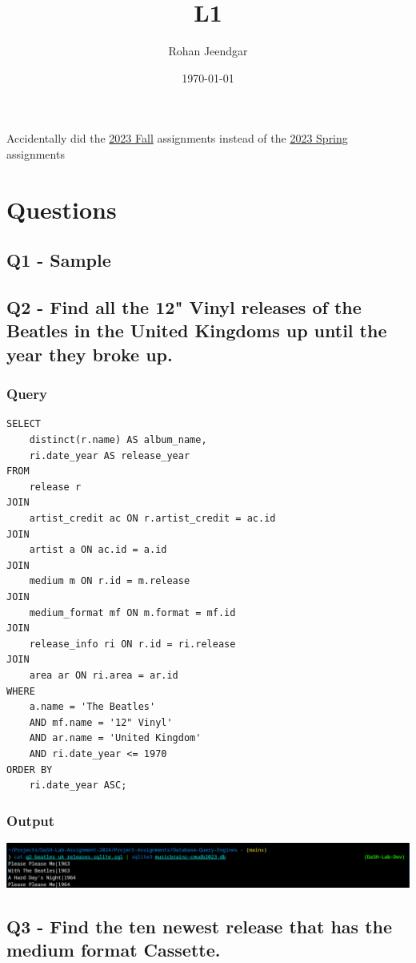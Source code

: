 \documentclass[11pt]{article}
\author{Rohan Jeendgar}
\date{\today}
\title{L1}
\begin{document}
\maketitle
\tableofcontents

Accidentally did the \href{https://15445.courses.cs.cmu.edu/fall2023/homework1/}{2023 Fall} assignments instead of the \href{https://15445.courses.cs.cmu.edu/spring2023/homework1/}{2023 Spring} assignments
\section{Questions}
\label{sec:org77b212d}
\subsection{Q1 - Sample}
\label{sec:org28f8250}
\subsection{Q2 - Find all the 12" Vinyl releases of the Beatles in the United Kingdoms up until the year they broke up.}
\label{sec:orgc064968}
\subsubsection{Query}
\label{sec:org17f4b11}
\begin{verbatim}
SELECT
    distinct(r.name) AS album_name,
    ri.date_year AS release_year
FROM
    release r
JOIN
    artist_credit ac ON r.artist_credit = ac.id
JOIN
    artist a ON ac.id = a.id
JOIN
    medium m ON r.id = m.release
JOIN
    medium_format mf ON m.format = mf.id
JOIN
    release_info ri ON r.id = ri.release
JOIN
    area ar ON ri.area = ar.id
WHERE
    a.name = 'The Beatles'
    AND mf.name = '12" Vinyl'
    AND ar.name = 'United Kingdom'
    AND ri.date_year <= 1970
ORDER BY
    ri.date_year ASC;

\end{verbatim}
\subsubsection{Output}
\label{sec:org39a21d0}
\begin{center}
\includegraphics[width=.9\linewidth]{./images/Q2.png}
\end{center}
\subsection{Q3 - Find the ten newest release that has the medium format Cassette.}
\label{sec:org28c31b5}
\end{document}
